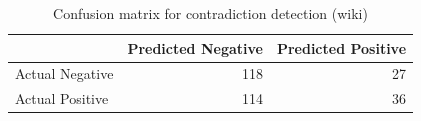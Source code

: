 \begin{table}
\caption{Confusion matrix for contradiction detection (wiki)}
\label{tab:confusion_matrix}
\begin{tabular}{lrr}
\toprule
 & Predicted Negative & Predicted Positive \\
\midrule
Actual Negative & 118 & 27 \\
Actual Positive & 114 & 36 \\
\bottomrule
\end{tabular}
\end{table}
